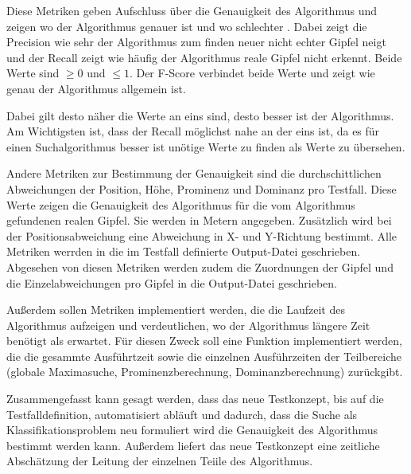 Diese Metriken geben Aufschluss über die Genauigkeit des Algorithmus und zeigen wo der Algorithmus genauer ist und wo schlechter . Dabei zeigt die Precision wie sehr der Algorithmus zum finden neuer nicht echter Gipfel neigt und der Recall zeigt wie häufig der Algorithmus reale Gipfel nicht erkennt. Beide Werte sind $\geq 0$ und $\leq 1$. Der F-Score verbindet beide Werte und zeigt wie genau der Algorithmus allgemein ist. 

Dabei  gilt desto näher die Werte an eins sind, desto besser ist der Algorithmus. Am Wichtigsten ist, dass der Recall möglichst nahe an der eins ist, da es für einen Suchalgorithmus besser ist unötige Werte zu finden als Werte zu übersehen. 

Andere Metriken zur Bestimmung der Genauigkeit sind die durchschittlichen Abweichungen der Position, Höhe, Prominenz und Dominanz pro Testfall. Diese Werte zeigen die Genauigkeit des Algorithmus für die vom Algorithmus gefundenen realen Gipfel. Sie werden in Metern angegeben. Zusätzlich wird bei der Positionsabweichung eine Abweichung in X- und Y-Richtung bestimmt. Alle Metriken werrden in die im Testfall definierte Output-Datei geschrieben. Abgesehen von diesen Metriken werden zudem die Zuordnungen der Gipfel und die Einzelabweichungen pro Gipfel in die Output-Datei geschrieben.

Außerdem sollen Metriken implementiert werden, die die Laufzeit des Algorithmus aufzeigen und verdeutlichen, wo der Algorithmus längere Zeit benötigt als erwartet. Für diesen Zweck soll eine Funktion implementiert werden, die die gesammte Ausführtzeit sowie die einzelnen Ausführzeiten der Teilbereiche (globale Maximasuche, Prominenzberechnung, Dominanzberechnung) zurückgibt. 

Zusammengefasst kann gesagt werden, dass das neue Testkonzept, bis auf die Testfalldefinition, automatisiert abläuft und dadurch, dass die Suche als Klassifikationsproblem neu formuliert wird die Genauigkeit des Algorithmus bestimmt werden kann. Außerdem liefert das neue Testkonzept eine zeitliche Abschätzung der Leitung der einzelnen Teiile des Algorithmus. 


